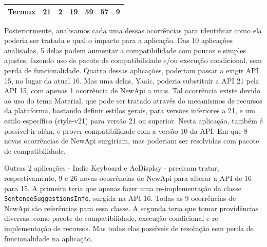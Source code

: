 \begin{table}[!htbp]
\begin{tabular}{|l|r|r|r|r|r|r|}
Termux                                                                   & 21                                                                                 & 2                                                                                             & 19                                                                                 & 59                                                                                            & 57                                                                                       & 9                                                                                           \\ \hline
\end{tabular}
\end{table}

Posteriormente, analisamos cada uma dessas ocorrências para identificar como ela
poderia ser tratada e qual o impacto para a aplicação. Das 10 aplicações analisadas,
5 delas podem aumentar a compatibilidade com poucos e simples ajustes, fazendo uso
de pacote de compatibilidade e/ou execução condicional, sem perda de funcionalidade.
Quatro dessas aplicações, poderiam passar a exigir API 15, no lugar da atual 16. Mas
uma delas, Yaaic, poderia substituir a API 21 pela API 15, com apenas 1 ocorrência de
NewApi a mais. Tal ocorrência existe devido ao uso do tema Material\cite{Material},
que pode ser tratado através do mecanismos de recursos da plataforma, bastando definir
estilos gerais, para versões inferiores a 21, e um estilo específico (style-v21) para
versão 21 ou superior. Nesta aplicação, também é possível ir além, e prover
compatibilidade com a versão 10 da API. Em que 8 novas ocorrências de NewApi surgiriam,
mas poderiam ser resolvidas com pacote de compatibilidade.

Outras 2 aplicações - Indic Keyboard e AcDisplay - precisam tratar, respectivamente,
9 e 26 novas ocorrências de NewApi para alterar a API de 16 para 15. A primeira teria
que apenas fazer uma re-implementação da classe \texttt{SentenceSuggestionsInfo},
surgida na API 16. Todas as 9 ocorrências de NewApi são referências para essa classe.
A segunda teria que tomar providências diversas, como pacote de compatibilidade, execução
condicional e re-implementação de recursos. Mas todas elas possíveis de resolução sem perda
de funcionalidade na aplicação.

